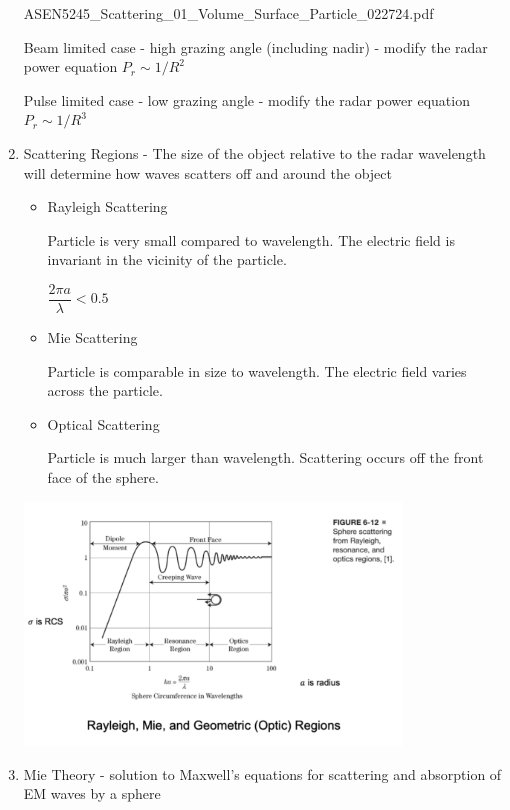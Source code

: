 \documentclass[10pt]{article}
\renewcommand{\frac}{\dfrac}
\begin{document}
\begin{enumerate}
ASEN5245\_Scattering\_01\_Volume\_Surface\_Particle\_022724.pdf

Beam limited case - high grazing angle (including nadir) - modify the radar power equation $P_r \sim 1/R^2$

Pulse limited case - low grazing angle - modify the radar power equation $P_r \sim 1/R^3$



\item Scattering Regions - The size of the object relative to the radar wavelength will determine
how waves scatters off and around the object

\begin{itemize}
	\item Rayleigh Scattering
	
	Particle is very small compared to wavelength. The electric field is invariant in the vicinity of the particle.
	
	$\frac{2\pi a}{\lambda}< 0.5$
	
	\item Mie Scattering
	
	Particle is comparable in size to wavelength. The electric field varies across the particle.
	
	
	\item Optical Scattering
	
	Particle is much larger than wavelength. Scattering occurs off the front face of the sphere.
	
	
\end{itemize}

\includegraphics[width=0.79\textwidth]{figs/scattering_regions.png}

\item Mie Theory - solution to Maxwell's equations for scattering and absorption of EM waves by a sphere


\end{enumerate}
\end{document}
